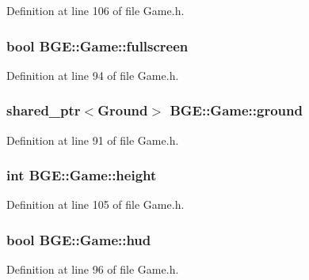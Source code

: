 Definition at line 106 of file Game.\-h.

\hypertarget{class_b_g_e_1_1_game_a6ccd351839e577cef28ffab9b64fb576}{
\subsubsection[{fullscreen}]{\setlength{\rightskip}{0pt plus 5cm}bool B\-G\-E\-::\-Game\-::fullscreen}}\label{class_b_g_e_1_1_game_a6ccd351839e577cef28ffab9b64fb576}


Definition at line 94 of file Game.\-h.

\hypertarget{class_b_g_e_1_1_game_a116334f4ca84d0941072968b941b8c39}{
\subsubsection[{ground}]{\setlength{\rightskip}{0pt plus 5cm}shared\-\_\-ptr$<${\bf Ground}$>$ B\-G\-E\-::\-Game\-::ground}}\label{class_b_g_e_1_1_game_a116334f4ca84d0941072968b941b8c39}


Definition at line 91 of file Game.\-h.

\hypertarget{class_b_g_e_1_1_game_ac012b897d5a88993c5c77cd633338a0e}{
\subsubsection[{height}]{\setlength{\rightskip}{0pt plus 5cm}int B\-G\-E\-::\-Game\-::height}}\label{class_b_g_e_1_1_game_ac012b897d5a88993c5c77cd633338a0e}


Definition at line 105 of file Game.\-h.

\hypertarget{class_b_g_e_1_1_game_aa7754d7d3f8b64ee1de1a540b32e83b1}{
\subsubsection[{hud}]{\setlength{\rightskip}{0pt plus 5cm}bool B\-G\-E\-::\-Game\-::hud}}\label{class_b_g_e_1_1_game_aa7754d7d3f8b64ee1de1a540b32e83b1}


Definition at line 96 of file Game.\-h.


